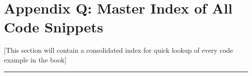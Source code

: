 \hypertarget{appendix-q-master-index-of-all-code-snippets}{%
\chapter{Appendix Q: Master Index of All Code
Snippets}\label{appendix-q-master-index-of-all-code-snippets}}

{[}This section will contain a consolidated index for quick lookup of
every code example in the book{]}

\begin{center}\rule{0.5\linewidth}{0.5pt}\end{center}
